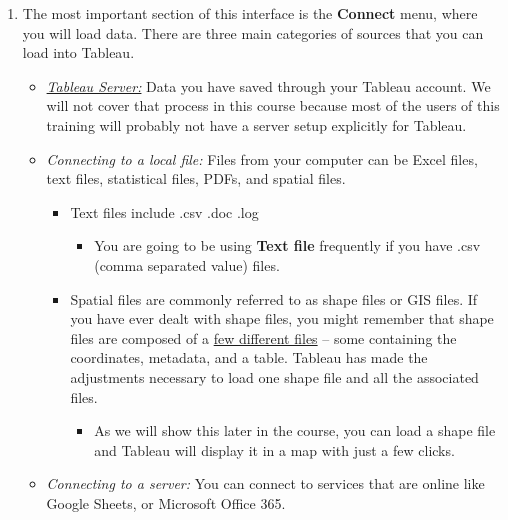 \documentclass[
]{book}
\providecommand{\tightlist}{%
  \setlength{\itemsep}{0pt}\setlength{\parskip}{0pt}}
\begin{document}
\begin{enumerate}
\def\labelenumi{\arabic{enumi}.}
\tightlist
\item
  The most important section of this interface is the \textbf{Connect} menu, where you will load data. There are three main categories of sources that you can load into Tableau.

  \begin{itemize}
  \tightlist
  \item
    \href{https://www.tableau.com/trial/tableau-server?utm_campaign_id=2017049\&utm_campaign=Prospecting-PROD-ALL-ALL-ALL-ALL\&utm_medium=Paid+Search\&utm_source=Bing\&utm_language=EN\&utm_country=USCA\&kw=tableau\%20server\&adgroup=CTX-Brand-Tableau+Server-E\&adused=ETA\&matchtype=e\&placement=\&gclid=c64d924d9b59166571a0f375554410ea\&gclsrc=3p.ds\&msclkid=c64d924d9b59166571a0f375554410ea}{\emph{Tableau Server:}} Data you have saved through your Tableau account. We will not cover that process in this course because most of the users of this training will probably not have a server setup explicitly for Tableau.
  \item
    \emph{Connecting to a local file:} Files from your computer can be Excel files, text files, statistical files, PDFs, and spatial files.

    \begin{itemize}
    \tightlist
    \item
      Text files include .csv .doc .log

      \begin{itemize}
      \tightlist
      \item
        You are going to be using \textbf{Text file} frequently if you have .csv (comma separated value) files.
      \end{itemize}
    \item
      Spatial files are commonly referred to as shape files or GIS files. If you have ever dealt with shape files, you might remember that shape files are composed of a \href{https://gisgeography.com/arcgis-shapefile-files-types-extensions/}{few different files} -- some containing the coordinates, metadata, and a table. Tableau has made the adjustments necessary to load one shape file and all the associated files.

      \begin{itemize}
      \tightlist
      \item
        As we will show this later in the course, you can load a shape file and Tableau will display it in a map with just a few clicks.
      \end{itemize}
    \end{itemize}
  \item
    \emph{Connecting to a server:} You can connect to services that are online like Google Sheets, or Microsoft Office 365.


\end{itemize}
\end{enumerate}
\end{document}
